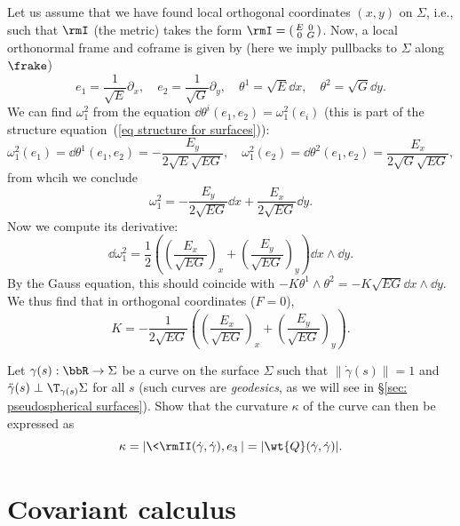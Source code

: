 \begin{example}\label{ex Gauss curvature in orthogonal coords}
    Let us assume that we have found local orthogonal coordinates $(x,y)$ on $\Sigma$, i.e., such that $\rmI$ (the metric) takes the form $\rmI=\left(\begin{smallmatrix}
        E & 0\\
        0 & G
    \end{smallmatrix}\right)$.
    Now, a local orthonormal frame and coframe is given by (here we imply pullbacks to $\Sigma$ along $\frake$)
    \[e_1=\frac{1}{\sqrt{E}}\partial_x,\quad e_2=\frac{1}{\sqrt{G}}\partial_y,\quad \theta^1=\sqrt{E}\dd x,\quad \theta^2=\sqrt{G}\dd y.\]
    We can find $\omega_1^2$ from the equation $\dd\theta^i(e_1,e_2)=\omega_1^2(e_i)$ (this is part of the structure equation~(\ref{eq structure for surfaces})):
    \[\omega_1^2(e_1)=\dd\theta^1(e_1,e_2)=-\frac{E_y}{2\sqrt{E}\sqrt{EG}},\quad \omega_1^2(e_2)=\dd\theta^2(e_1,e_2)=\frac{E_x}{2\sqrt{G}\sqrt{EG}},\]
    from whcih we conclude 
    \[\omega_1^2=-\frac{E_y}{2\sqrt{EG}}\dd x+\frac{E_x}{2\sqrt{EG}}\dd y.\]
    Now we compute its derivative:
    \[\dd\omega_1^2=\frac12\left(\left(\frac{E_x}{\sqrt{EG}}\right)_x+\left(\frac{E_y}{\sqrt{EG}}\right)_y\right)\dd x\wedge\dd y.\]
    By the Gauss equation, this should coincide with $-K\theta^1\wedge\theta^2=-K\sqrt{EG}\dd x\wedge\dd y$. We thus find that in orthogonal coordinates ($F=0$), 
    \[K=-\frac{1}{2\sqrt{EG}}\left(\left(\frac{E_x}{\sqrt{EG}}\right)_x+\left(\frac{E_y}{\sqrt{EG}}\right)_y\right).\label{eq K in orthogonal coords}\]
\end{example}


\begin{xca}
    Let $\gamma(s):\bbR\to \Sigma$ be a curve on the surface $\Sigma$ such that $\lVert\dot\gamma(s)\rVert=1$ and $\ddot\gamma(s)\perp \T_{\gamma(s)}\Sigma$ for all $s$ (such curves are \emph{geodesics}, as we will see in \S\ref{sec: pseudospherical surfaces}). Show that the curvature $\kappa$ of the curve can then be expressed as
    \[\kappa=\left|\<\rmII(\dot\gamma,\dot\gamma),e_3\>\right|=|\wt{Q}(\dot\gamma,\dot\gamma)|.\]
\end{xca}







\section{Covariant calculus}


